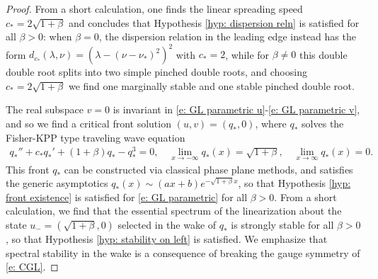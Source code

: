 \documentclass[11pt]{article}
\numberwithin{equation}{section}
\numberwithin{prop}{section}
\begin{document}
\begin{proof}
	From a short calculation, one finds the linear spreading speed $c_* = 2 \sqrt{1 + \beta}$ and concludes that Hypothesis \ref{hyp: dispersion reln} is satisfied for all $\beta > 0$: when $\beta = 0$, the dispersion relation in the leading edge instead has the form $d_{c_*} (\lambda, \nu) = (\lambda-(\nu-\nu_*)^2)^2$ with $c_* = 2$, while for $\beta \neq 0$ this double double root splits into two simple pinched double roots, and choosing $c_* = 2 \sqrt{1+\beta}$ we find one marginally stable and one stable pinched double root. 
	
	The real subspace $v= 0 $ is invariant in \eqref{e: GL parametric u}-\eqref{e: GL parametric v}, and so we find a critical front solution $(u, v) = (q_*, 0)$, where $q_*$ solves the Fisher-KPP type traveling wave equation
	\begin{align}
	q_*'' + c_* q_*' + (1+\beta) q_* - q_*^3 = 0, \quad \lim_{x \to - \infty} q_*(x) = \sqrt{1 + \beta}, \quad \lim_{x \to \infty} q_*(x) = 0. 
	\end{align}
	This front $q_*$ can be constructed via classical phase plane methods, and satisfies the generic asymptotics $q_*(x) \sim (ax + b)e^{-\sqrt{1+\beta} x}$, so that Hypothesis \ref{hyp: front existence} is satisfied for \eqref{e: GL parametric} for all $\beta > 0$. From a short calculation, we find that the essential spectrum of the linearization about the state $u_- = (\sqrt{1+\beta},0)$ selected in the wake of $q_*$ is strongly stable for all $\beta > 0$, so that Hypothesis \ref{hyp: stability on left} is satisfied. We emphasize that spectral stability in the wake is a consequence of breaking the gauge symmetry of \eqref{e: CGL}. 
	

\end{proof}
\end{document}
